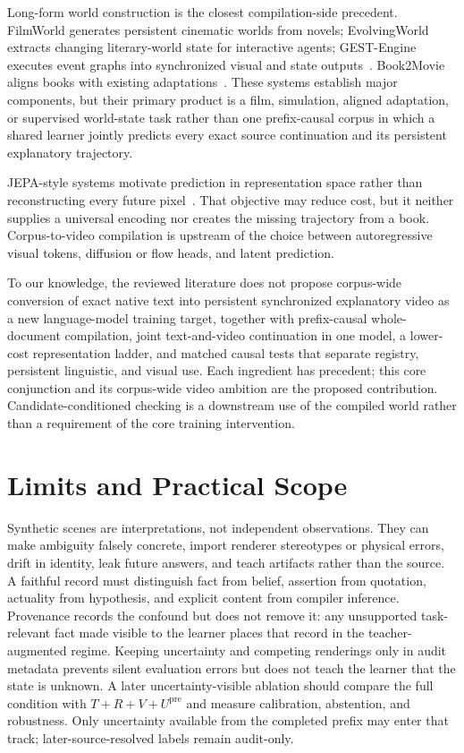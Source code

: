 \documentclass[11pt]{article}
\begin{document}
Long-form world construction is the closest compilation-side precedent. FilmWorld generates persistent cinematic worlds from novels; EvolvingWorld extracts changing literary-world state for interactive agents; GEST-Engine executes event graphs into synchronized visual and state outputs~\cite{filmworld,evolvingworld,gestengine}. Book2Movie aligns books with existing adaptations~\cite{book2movie}. These systems establish major components, but their primary product is a film, simulation, aligned adaptation, or supervised world-state task rather than one prefix-causal corpus in which a shared learner jointly predicts every exact source continuation and its persistent explanatory trajectory.

JEPA-style systems motivate prediction in representation space rather than reconstructing every future pixel~\cite{lecun2022path,vjepa2}. That objective may reduce cost, but it neither supplies a universal encoding nor creates the missing trajectory from a book. Corpus-to-video compilation is upstream of the choice between autoregressive visual tokens, diffusion or flow heads, and latent prediction.

To our knowledge, the reviewed literature does not propose corpus-wide conversion of exact native text into persistent synchronized explanatory video as a new language-model training target, together with prefix-causal whole-document compilation, joint text-and-video continuation in one model, a lower-cost representation ladder, and matched causal tests that separate registry, persistent linguistic, and visual use. Each ingredient has precedent; this core conjunction and its corpus-wide video ambition are the proposed contribution. Candidate-conditioned checking is a downstream use of the compiled world rather than a requirement of the core training intervention.

\section{Limits and Practical Scope}

Synthetic scenes are interpretations, not independent observations. They can make ambiguity falsely concrete, import renderer stereotypes or physical errors, drift in identity, leak future answers, and teach artifacts rather than the source. A faithful record must distinguish fact from belief, assertion from quotation, actuality from hypothesis, and explicit content from compiler inference. Provenance records the confound but does not remove it: any unsupported task-relevant fact made visible to the learner places that record in the teacher-augmented regime. Keeping uncertainty and competing renderings only in audit metadata prevents silent evaluation errors but does not teach the learner that the state is unknown. A later uncertainty-visible ablation should compare the full condition with $T+R+V+U^{\mathrm{pre}}$ and measure calibration, abstention, and robustness. Only uncertainty available from the completed prefix may enter that track; later-source-resolved labels remain audit-only.
\end{document}
